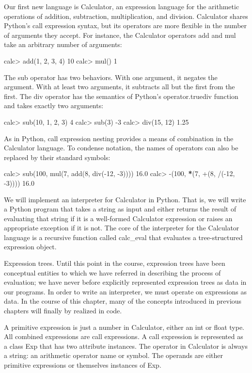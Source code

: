 \documentclass[letterpaper,10pt,dvipdfmx]{sphinxmanual}
\begin{document}
Our first new language is Calculator, an expression language for the arithmetic operations of addition, subtraction, multiplication, and division. Calculator shares Python's call expression syntax, but its operators are more flexible in the number of arguments they accept. For instance, the Calculator operators add and mul take an arbitrary number of arguments:

calc\textgreater{} add(1, 2, 3, 4)
10
calc\textgreater{} mul()
1

The sub operator has two behaviors. With one argument, it negates the argument. With at least two arguments, it subtracts all but the first from the first. The div operator has the semantics of Python's operator.truediv function and takes exactly two arguments:

calc\textgreater{} sub(10, 1, 2, 3)
4
calc\textgreater{} sub(3)
-3
calc\textgreater{} div(15, 12)
1.25

As in Python, call expression nesting provides a means of combination in the Calculator language. To condense notation, the names of operators can also be replaced by their standard symbols:

calc\textgreater{} sub(100, mul(7, add(8, div(-12, -3))))
16.0
calc\textgreater{} -(100, {\color{red}\bfseries{}*}(7, +(8, /(-12, -3))))
16.0

We will implement an interpreter for Calculator in Python. That is, we will write a Python program that takes a string as input and either returns the result of evaluating that string if it is a well-formed Calculator expression or raises an appropriate exception if it is not. The core of the interpreter for the Calculator language is a recursive function called calc\_eval that evaluates a tree-structured expression object.

Expression trees. Until this point in the course, expression trees have been conceptual entities to which we have referred in describing the process of evaluation; we have never before explicitly represented expression trees as data in our programs. In order to write an interpreter, we must operate on expressions as data. In the course of this chapter, many of the concepts introduced in previous chapters will finally by realized in code.

A primitive expression is just a number in Calculator, either an int or float type. All combined expressions are call expressions. A call expression is represented as a class Exp that has two attribute instances. The operator in Calculator is always a string: an arithmetic operator name or symbol. The operands are either primitive expressions or themselves instances of Exp.
\end{document}
